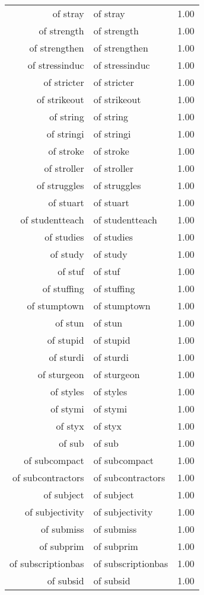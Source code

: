 \begin{table}[ht]
\begin{tabular}{rlr}
  of stray & of stray & 1.00 \\ 
  of strength & of strength & 1.00 \\ 
  of strengthen & of strengthen & 1.00 \\ 
  of stressinduc & of stressinduc & 1.00 \\ 
  of stricter & of stricter & 1.00 \\ 
  of strikeout & of strikeout & 1.00 \\ 
  of string & of string & 1.00 \\ 
  of stringi & of stringi & 1.00 \\ 
  of stroke & of stroke & 1.00 \\ 
  of stroller & of stroller & 1.00 \\ 
  of struggles & of struggles & 1.00 \\ 
  of stuart & of stuart & 1.00 \\ 
  of studentteach & of studentteach & 1.00 \\ 
  of studies & of studies & 1.00 \\ 
  of study & of study & 1.00 \\ 
  of stuf & of stuf & 1.00 \\ 
  of stuffing & of stuffing & 1.00 \\ 
  of stumptown & of stumptown & 1.00 \\ 
  of stun & of stun & 1.00 \\ 
  of stupid & of stupid & 1.00 \\ 
  of sturdi & of sturdi & 1.00 \\ 
  of sturgeon & of sturgeon & 1.00 \\ 
  of styles & of styles & 1.00 \\ 
  of stymi & of stymi & 1.00 \\ 
  of styx & of styx & 1.00 \\ 
  of sub & of sub & 1.00 \\ 
  of subcompact & of subcompact & 1.00 \\ 
  of subcontractors & of subcontractors & 1.00 \\ 
  of subject & of subject & 1.00 \\ 
  of subjectivity & of subjectivity & 1.00 \\ 
  of submiss & of submiss & 1.00 \\ 
  of subprim & of subprim & 1.00 \\ 
  of subscriptionbas & of subscriptionbas & 1.00 \\ 
  of subsid & of subsid & 1.00 \\ 

\end{tabular}
\end{table}
